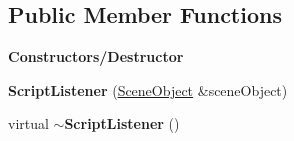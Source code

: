 \subsection*{Public Member Functions}
\begin{Indent}\textbf{ Constructors/\+Destructor}\par
\begin{DoxyCompactItemize}
\item 
\mbox{\label{classrev_1_1_script_listener_a8a354cfd0b62c9b7ebfd66a9c6c024ca}} 
{\bfseries Script\+Listener} (\mbox{\hyperlink{classrev_1_1_scene_object}{Scene\+Object}} \&scene\+Object)
\item 
\mbox{\label{classrev_1_1_script_listener_a45f9a0c8f9fb22829d1c457e7a07be00}} 
virtual {\bfseries $\sim$\+Script\+Listener} ()
\end{DoxyCompactItemize}
\end{Indent}
